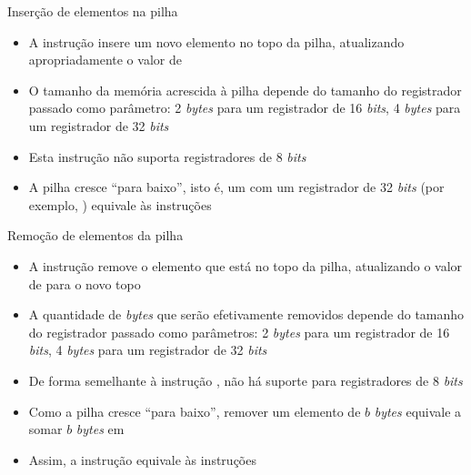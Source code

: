 \begin{frame}[fragile]{Inserção de elementos na pilha}

    \begin{itemize}
        \item A instrução  insere um novo elemento no topo da pilha, atualizando
            apropriadamente o valor de 


        \item O tamanho da memória acrescida à pilha depende do tamanho do registrador passado
            como parâmetro: 2 \textit{bytes} para um registrador de 16 \textit{bits}, 4 
            \textit{bytes} para um registrador de 32 \textit{bits}

        \item Esta instrução não suporta registradores de 8 \textit{bits}

        \item A pilha cresce ``para baixo'', isto é, um  com um registrador de
            32 \textit{bits} (por exemplo, ) equivale às instruções


    \end{itemize}

\end{frame}



\begin{frame}[fragile]{Remoção de elementos da pilha}

    \begin{itemize}
        \item A instrução  remove o elemento que está no topo da pilha,
            atualizando o valor de  para o novo topo


        \item A quantidade de \textit{bytes} que serão efetivamente removidos depende do
            tamanho do registrador passado como parâmetros: 2 \textit{bytes} para um registrador 
            de 16 \textit{bits}, 4 \textit{bytes} para um registrador de 32 \textit{bits}

        \item De forma semelhante à instrução , não há suporte para registradores
            de 8 \textit{bits}

        \item Como a pilha cresce ``para baixo'', remover um elemento de $b$ \textit{bytes}
            equivale a somar $b$ \textit{bytes} em 

        \item Assim, a instrução  equivale às instruções

    \end{itemize}

\end{frame}

